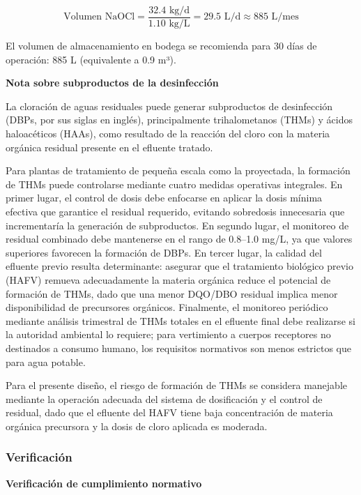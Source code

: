 \documentclass[12pt,a4paper]{article}
\begin{document}
\begin{equation}
\text{Volumen NaOCl} = \frac{32.4 \text{ kg/d}}{1.10 \text{ kg/L}} = 29.5 \text{ L/d} \approx 885 \text{ L/mes}
\end{equation}

El volumen de almacenamiento en bodega se recomienda para 30 días de operación: 885 L (equivalente a 0.9 m³).

\textbf{Nota sobre subproductos de la desinfección}

La cloración de aguas residuales puede generar subproductos de desinfección (DBPs, por sus siglas en inglés), principalmente trihalometanos (THMs) y ácidos haloacéticos (HAAs), como resultado de la reacción del cloro con la materia orgánica residual presente en el efluente tratado.

Para plantas de tratamiento de pequeña escala como la proyectada, la formación de THMs puede controlarse mediante cuatro medidas operativas integrales. En primer lugar, el control de dosis debe enfocarse en aplicar la dosis mínima efectiva que garantice el residual requerido, evitando sobredosis innecesaria que incrementaría la generación de subproductos. En segundo lugar, el monitoreo de residual combinado debe mantenerse en el rango de 0.8--1.0 mg/L, ya que valores superiores favorecen la formación de DBPs. En tercer lugar, la calidad del efluente previo resulta determinante: asegurar que el tratamiento biológico previo (HAFV) remueva adecuadamente la materia orgánica reduce el potencial de formación de THMs, dado que una menor DQO/DBO residual implica menor disponibilidad de precursores orgánicos. Finalmente, el monitoreo periódico mediante análisis trimestral de THMs totales en el efluente final debe realizarse si la autoridad ambiental lo requiere; para vertimiento a cuerpos receptores no destinados a consumo humano, los requisitos normativos son menos estrictos que para agua potable.

Para el presente diseño, el riesgo de formación de THMs se considera manejable mediante la operación adecuada del sistema de dosificación y el control de residual, dado que el efluente del HAFV tiene baja concentración de materia orgánica precursora y la dosis de cloro aplicada es moderada.

\subsubsection{Verificación}

\textbf{Verificación de cumplimiento normativo}
\end{document}
